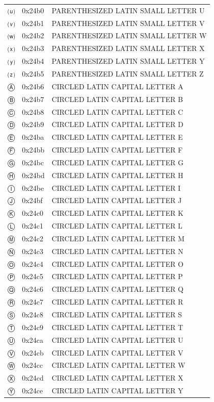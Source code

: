 \documentclass[12pt, twoside]{article}
\begin{document}
\begin{longtable}{L{1.0cm} L{2.0cm} >{\footnotesize}L{10cm}}
$⒰$&0x24b0&PARENTHESIZED LATIN SMALL LETTER U\\
$⒱$&0x24b1&PARENTHESIZED LATIN SMALL LETTER V\\
$⒲$&0x24b2&PARENTHESIZED LATIN SMALL LETTER W\\
$⒳$&0x24b3&PARENTHESIZED LATIN SMALL LETTER X\\
$⒴$&0x24b4&PARENTHESIZED LATIN SMALL LETTER Y\\
$⒵$&0x24b5&PARENTHESIZED LATIN SMALL LETTER Z\\
$Ⓐ$&0x24b6&CIRCLED LATIN CAPITAL LETTER A\\
$Ⓑ$&0x24b7&CIRCLED LATIN CAPITAL LETTER B\\
$Ⓒ$&0x24b8&CIRCLED LATIN CAPITAL LETTER C\\
$Ⓓ$&0x24b9&CIRCLED LATIN CAPITAL LETTER D\\
$Ⓔ$&0x24ba&CIRCLED LATIN CAPITAL LETTER E\\
$Ⓕ$&0x24bb&CIRCLED LATIN CAPITAL LETTER F\\
$Ⓖ$&0x24bc&CIRCLED LATIN CAPITAL LETTER G\\
$Ⓗ$&0x24bd&CIRCLED LATIN CAPITAL LETTER H\\
$Ⓘ$&0x24be&CIRCLED LATIN CAPITAL LETTER I\\
$Ⓙ$&0x24bf&CIRCLED LATIN CAPITAL LETTER J\\
$Ⓚ$&0x24c0&CIRCLED LATIN CAPITAL LETTER K\\
$Ⓛ$&0x24c1&CIRCLED LATIN CAPITAL LETTER L\\
$Ⓜ$&0x24c2&CIRCLED LATIN CAPITAL LETTER M\\
$Ⓝ$&0x24c3&CIRCLED LATIN CAPITAL LETTER N\\
$Ⓞ$&0x24c4&CIRCLED LATIN CAPITAL LETTER O\\
$Ⓟ$&0x24c5&CIRCLED LATIN CAPITAL LETTER P\\
$Ⓠ$&0x24c6&CIRCLED LATIN CAPITAL LETTER Q\\
$Ⓡ$&0x24c7&CIRCLED LATIN CAPITAL LETTER R\\
$Ⓢ$&0x24c8&CIRCLED LATIN CAPITAL LETTER S\\
$Ⓣ$&0x24c9&CIRCLED LATIN CAPITAL LETTER T\\
$Ⓤ$&0x24ca&CIRCLED LATIN CAPITAL LETTER U\\
$Ⓥ$&0x24cb&CIRCLED LATIN CAPITAL LETTER V\\
$Ⓦ$&0x24cc&CIRCLED LATIN CAPITAL LETTER W\\
$Ⓧ$&0x24cd&CIRCLED LATIN CAPITAL LETTER X\\
$Ⓨ$&0x24ce&CIRCLED LATIN CAPITAL LETTER Y\\

\end{longtable}
\end{document}
